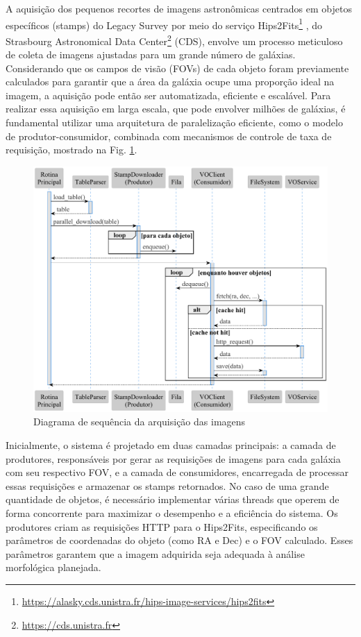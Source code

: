 A aquisição dos pequenos recortes de imagens astronômicas centrados em objetos específicos (stamps) do Legacy Survey por meio do serviço Hips2Fits\footnote{\url{https://alasky.cds.unistra.fr/hips-image-services/hips2fits}} \citep{aladin}, do Strasbourg Astronomical Data Center\footnote{\url{https://cds.unistra.fr}} (CDS), envolve um processo meticuloso de coleta de imagens ajustadas para um grande número de galáxias. Considerando que os campos de visão (FOVs) de cada objeto foram previamente calculados para garantir que a área da galáxia ocupe uma proporção ideal na imagem, a aquisição pode então ser automatizada, eficiente e escalável. Para realizar essa aquisição em larga escala, que pode envolver milhões de galáxias, é fundamental utilizar uma arquitetura de paralelização eficiente, como o modelo de produtor-consumidor, combinada com mecanismos de controle de taxa de requisição, mostrado na Fig. \ref{fig:stamps-sequence}.

\begin{figure}[!ht]
  \centering
  \includegraphics[width=\linewidth]{diagrams/plots/sequence.pdf}
  \caption{Diagrama de sequência da arquisição das imagens}
  \label{fig:stamps-sequence}
\end{figure}


Inicialmente, o sistema é projetado em duas camadas principais: a camada de produtores, responsáveis por gerar as requisições de imagens para cada galáxia com seu respectivo FOV, e a camada de consumidores, encarregada de processar essas requisições e armazenar os stamps retornados. No caso de uma grande quantidade de objetos, é necessário implementar várias threads que operem de forma concorrente para maximizar o desempenho e a eficiência do sistema. Os produtores criam as requisições HTTP para o Hips2Fits, especificando os parâmetros de coordenadas do objeto (como RA e Dec) e o FOV calculado. Esses parâmetros garantem que a imagem adquirida seja adequada à análise morfológica planejada.

